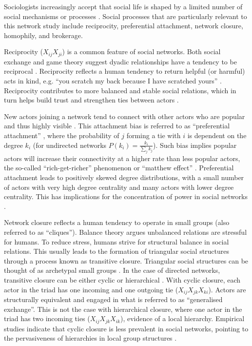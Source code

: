 Sociologists increasingly accept that social life is shaped by a limited number of social mechanisms or processes \citep{crossley2015cases}. Social processes that are particularly relevant to this network study include reciprocity, preferential attachment, network closure, homophily, and brokerage. \medskip

Reciprocity  (\(X_{ij}X_{ji}\)) is a common feature of social networks. Both social exchange and game theory suggest dyadic relationships have a tendency to be reciprocal \citep{emerson1976social,axelrod1984evolution}. Reciprocity reflects a human tendency to return helpful (or harmful) acts in kind, e.g. \enquote{you scratch my back because I have scratched yours} \citep{nowak2005evolution}. Reciprocity contributes to more balanced and stable social relations, which in turn helps build trust and strengthen ties between actors \citep{blau1964exchange}. \medskip

New actors joining a network tend to connect with other actors who are popular and thus highly visible \citep{desollaprice976general}. This attachment bias is referred to as \enquote{preferential attachment} \citep{barabasi1999emergence}, where the probability of \(j\) forming a tie with \(i\) is dependent on the degree \(k_{i}\) (for undirected networks \(P(k_{i})=\frac{k_{i}}{\sum_{j}k_{j}}\)). Such bias implies popular actors will increase their connectivity at a higher rate than less popular actors, the so-called \enquote{rich-get-richer} phenomenon or \enquote{matthew effect} \citep{desollaprice1976general,adamic2000power,easley2010power}. Preferential attachment leads to positively skewed degree distributions, with a small number of actors with very high degree centrality and many actors with lower degree centrality. This has implications for the concentration of power in social networks \citep{emerson1962power}. \medskip 

Network closure reflects a human tendency to operate in small groups (also referred to as \enquote{cliques}). Balance theory argues unbalanced relations are stressful for humans. To reduce stress, humans strive for structural balance in social relations. This usually leads to the formation of triangular social structures through a process known as transitive closure. Triangular social structures can be thought of as archetypal small groups \citep{robins2015doing}. In the case of directed networks, transitive closure can be either cyclic or hierarchical \citep{davis1967structure}. With cyclic closure, each actor in the triad has one incoming and one outgoing tie (\(X_{ij}X_{jk}X_{ki}\)). Actors are structurally equivalent and engaged in what is referred to as \enquote{generalised exchange}. This is not the case with hierarchical closure, where one actor in the triad has two incoming ties (\(X_{ij}X_{jk}X_{ik}\)), evidence of a local hierarchy. Empirical studies indicate that cyclic closure is less prevalent in social networks, pointing to the pervasiveness of hierarchies in local group structures \citep{davis1967structure}. \medskip

